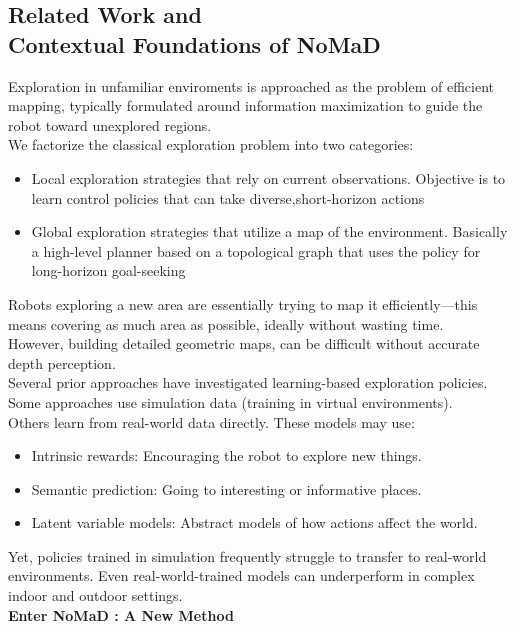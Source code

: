 \documentclass[12pt]{article}
\begin{document}
\newpage
\begin{appendices}
\section{Related Work and \\ Contextual Foundations of NoMaD}
Exploration in unfamiliar enviroments is approached as the problem of efficient mapping, typically formulated around information maximization to guide the robot toward unexplored regions.\\
We factorize the classical exploration problem into two categories:\\
\begin{itemize}
    \item Local exploration strategies that rely on current observations. Objective is to learn control policies that can take diverse,short-horizon actions
    \item Global exploration strategies that utilize a map of the environment. Basically a high-level planner based on a topological graph that uses the policy for long-horizon goal-seeking
\end{itemize}
Robots exploring a new area are essentially trying to map it efficiently—this means covering as much area as possible, ideally without wasting time.\\
However, building detailed geometric maps, can be difficult without accurate depth perception. \\
Several prior approaches have investigated learning-based exploration policies. Some approaches use simulation data (training in virtual environments).\\
Others learn from real-world data directly. These models may use:\\
\begin{itemize}
    \item Intrinsic rewards: Encouraging the robot to explore new things.
    \item Semantic prediction: Going to interesting or informative places.
    \item Latent variable models: Abstract models of how actions affect the world.
\end{itemize}
Yet, policies trained in simulation frequently struggle to transfer to real-world environments. Even real-world-trained models can underperform in complex indoor and outdoor settings.\\
\bigskip
\noindent \textbf{Enter NoMaD : A New Method}\\ 

\end{appendices}
\end{document}
